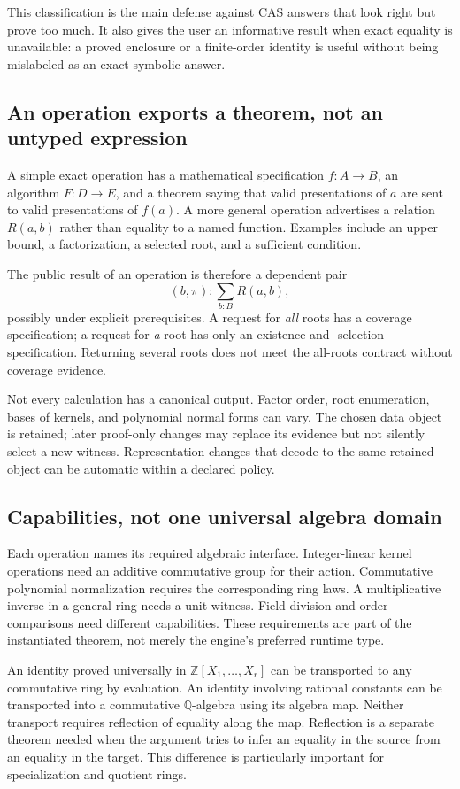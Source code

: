 \documentclass[11pt,letterpaper]{article}
\newcommand{\Z}{\mathbb Z}
\newcommand{\Q}{\mathbb Q}
\numberwithin{equation}{section}
\begin{document}
This classification is the main defense against CAS answers that look right but
prove too much. It also gives the user an informative result when exact equality
is unavailable: a proved enclosure or a finite-order identity is useful without
being mislabeled as an exact symbolic answer.

\subsection{An operation exports a theorem, not an untyped expression}
A simple exact operation has a mathematical specification $f:A\to B$, an
algorithm $F:D\to E$, and a theorem saying that valid presentations of $a$ are
sent to valid presentations of $f(a)$. A more general operation advertises a
relation $R(a,b)$ rather than equality to a named function. Examples include an
upper bound, a factorization, a selected root, and a sufficient condition.

The public result of an operation is therefore a dependent pair
\[
 (b,\pi):\sum_{b:B}R(a,b),
\]
possibly under explicit prerequisites. A request for \emph{all} roots has a
coverage specification; a request for \emph{a} root has only an existence-and-
selection specification. Returning several roots does not meet the all-roots
contract without coverage evidence.

Not every calculation has a canonical output. Factor order, root enumeration,
bases of kernels, and polynomial normal forms can vary. The chosen data object
is retained; later proof-only changes may replace its evidence but not silently
select a new witness. Representation changes that decode to the same retained
object can be automatic within a declared policy.

\subsection{Capabilities, not one universal algebra domain}
Each operation names its required algebraic interface. Integer-linear kernel
operations need an additive commutative group for their action. Commutative
polynomial normalization requires the corresponding ring laws. A multiplicative
inverse in a general ring needs a unit witness. Field division and order
comparisons need different capabilities. These requirements are part of the
instantiated theorem, not merely the engine's preferred runtime type.

An identity proved universally in $\Z[X_1,\ldots,X_r]$ can be transported to any
commutative ring by evaluation. An identity involving rational constants can be
transported into a commutative $\Q$-algebra using its algebra map. Neither transport
requires reflection of equality along the map. Reflection is a separate theorem
needed when the argument tries to infer an equality in the source from an equality
in the target. This difference is particularly important for specialization and
quotient rings.
\end{document}
